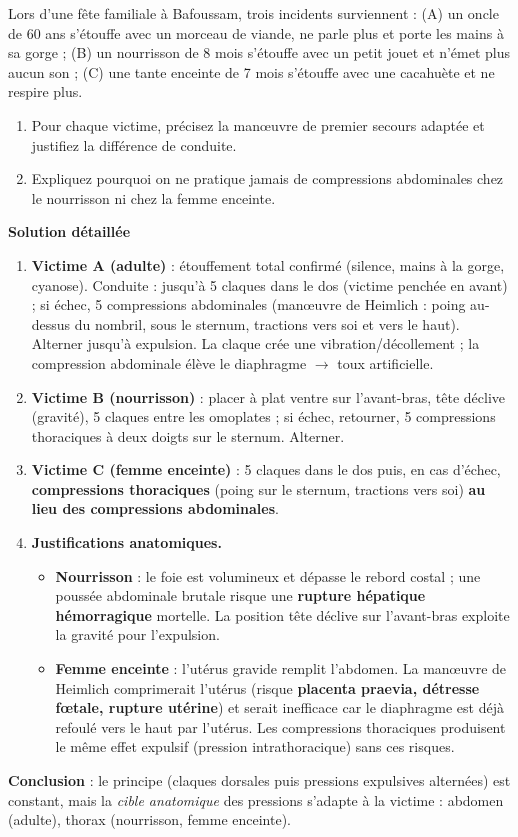 \documentclass[11pt]{article}
\begin{document}
\begin{exoresolu}
Lors d'une fête familiale à Bafoussam, trois incidents surviennent : (A) un oncle de 60 ans s'étouffe avec un morceau de viande, ne parle plus et porte les mains à sa gorge ; (B) un nourrisson de 8 mois s'étouffe avec un petit jouet et n'émet plus aucun son ; (C) une tante enceinte de 7 mois s'étouffe avec une cacahuète et ne respire plus.
\begin{enumerate}
\item Pour chaque victime, précisez la manœuvre de premier secours adaptée et justifiez la différence de conduite.
\item Expliquez pourquoi on ne pratique jamais de compressions abdominales chez le nourrisson ni chez la femme enceinte.
\end{enumerate}
\tcblower
\textbf{Solution détaillée}
\begin{enumerate}
\item \textbf{Victime A (adulte)} : étouffement total confirmé (silence, mains à la gorge, cyanose). Conduite : jusqu'à 5 claques dans le dos (victime penchée en avant) ; si échec, 5 compressions abdominales (manœuvre de Heimlich : poing au-dessus du nombril, sous le sternum, tractions vers soi et vers le haut). Alterner jusqu'à expulsion. La claque crée une vibration/décollement ; la compression abdominale élève le diaphragme $\rightarrow$ toux artificielle.
\item \textbf{Victime B (nourrisson)} : placer à plat ventre sur l'avant-bras, tête déclive (gravité), 5 claques entre les omoplates ; si échec, retourner, 5 compressions thoraciques à deux doigts sur le sternum. Alterner.
\item \textbf{Victime C (femme enceinte)} : 5 claques dans le dos puis, en cas d'échec, \textbf{compressions thoraciques} (poing sur le sternum, tractions vers soi) \textbf{au lieu des compressions abdominales}.
\item \textbf{Justifications anatomiques.}
\begin{itemize}
\item \textbf{Nourrisson} : le foie est volumineux et dépasse le rebord costal ; une poussée abdominale brutale risque une \textbf{rupture hépatique hémorragique} mortelle. La position tête déclive sur l'avant-bras exploite la gravité pour l'expulsion.
\item \textbf{Femme enceinte} : l'utérus gravide remplit l'abdomen. La manœuvre de Heimlich comprimerait l'utérus (risque \textbf{placenta praevia, détresse fœtale, rupture utérine}) et serait inefficace car le diaphragme est déjà refoulé vers le haut par l'utérus. Les compressions thoraciques produisent le même effet expulsif (pression intrathoracique) sans ces risques.
\end{itemize}
\end{enumerate}
\textbf{Conclusion} : le principe (claques dorsales puis pressions expulsives alternées) est constant, mais la \emph{cible anatomique} des pressions s'adapte à la victime : abdomen (adulte), thorax (nourrisson, femme enceinte).
\end{exoresolu}
\end{document}
